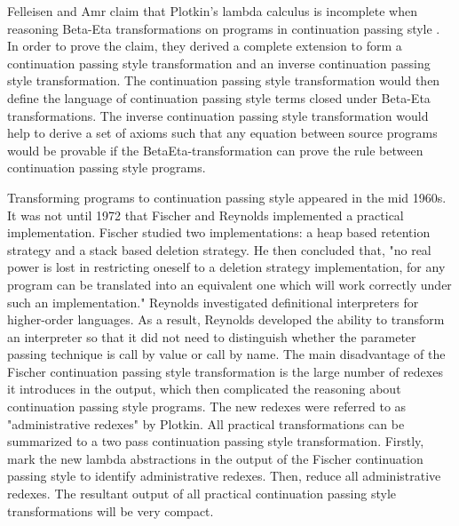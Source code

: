 
\usepackage{algorithm}
\usepackage{listings}
\usepackage{graphicx,amssymb,amsmath}
\usepackage{epstopdf}
\usepackage{setspace}
\sloppy

\oddsidemargin 0in
\evensidemargin 0in
\textwidth 6.5in
\topmargin -0.5in
\textheight 9.0in



\def \cps {continuation passing style }


\pagestyle{myheadings}  %
	 	
\doublespacing
Felleisen and Amr claim that Plotkin's lambda calculus is incomplete when reasoning Beta-Eta transformations on programs in \cps.  In order to prove the claim, they derived a complete extension to form a \cps transformation and an inverse \cps transformation.  The \cps transformation would then define the language of \cps terms closed under Beta-Eta transformations.  The inverse \cps transformation would help to derive a set of axioms such that any equation between source programs would be provable if the BetaEta-transformation can prove the rule between \cps programs.

Transforming programs to \cps appeared in the mid 1960s. It was not until 1972 that Fischer and Reynolds implemented a practical implementation. Fischer studied two implementations: a heap based retention strategy and a stack based deletion strategy. He then concluded that, "no real power is lost in restricting oneself to a deletion strategy implementation, for any program can be translated into an equivalent one which will work correctly under such an implementation." Reynolds investigated definitional interpreters for higher-order languages. As a result, Reynolds developed the ability to transform an interpreter so that it did not need to distinguish whether the parameter passing technique is call by value or call by name. The main disadvantage of the Fischer \cps transformation is the large number of redexes it introduces in the output, which then complicated the reasoning about \cps programs. The new redexes were referred to as "administrative redexes" by Plotkin. All practical transformations can be summarized to a two pass \cps transformation. Firstly, mark the new lambda abstractions in the output of the Fischer \cps to identify administrative redexes. Then, reduce all administrative redexes. The resultant output of all practical \cps transformations will be very compact.


